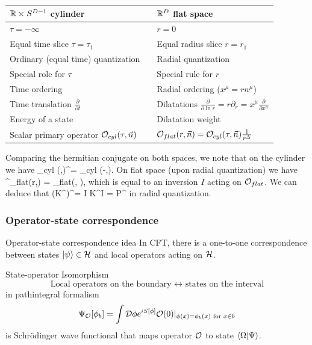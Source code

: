  \begin{tabular}{|lll|}
 	$\mathbb{R} \times S^{D-1}$ cylinder & \longrightarrow & $\mathbb{R}^D$ flat space \\
	\toprule
	$\tau = -\infty$ &&$r=0$\\
	Equal time slice $\tau =\tau_1$ && Equal radius slice $r=r_1$ \\
	Ordinary (equal time) quantization && Radial quantization \\
	Special role for $\tau$ && Special rule for $r$ \\
	Time ordering && Radial ordering ($x^\mu = r n^\mu$) \\
	Time translation $\frac{\partial}{\partial t}$ && Dilatations $\frac{\partial}{\partial \ln r} = r \partial_r = x^\mu \frac{\partial}{\partial x^\mu}$ \\
	Energy of a state && Dilatation weight \\
	Scalar primary operator $\mathcal{O}_{cyl}(\tau,\vec{n})$ && $\mathcal{O}_{flat}(r,\vec{n}) = \mathcal{O}_{cyl} (\tau,\vec{n}) \frac{1}{r^\Delta}$\\
\bottomrule 
\end{tabular}
\ese 
Comparing the hermitian conjugate on both spaces, we note that on the cylinder we have
\bse 
\mO_{cyl} (\tau,)^\dagger = \mO_{cyl} (-\tau,).
\ese 
On flat space (upon radial quantization) we have 
\be 
\label{eq:cftRadialQuantizationHermitianConjugate}
\mO^\dagger_{flat}(r,) =  \mO_{flat}(, ),
\ee 
which is equal to an inversion $I$ acting on $\mathcal{O}_{flat}$. We can deduce that 
\bse 
(K^\mu)^\dagger = I K^\mu I = P^\mu
\ese 
in radial quantization.

\subsubsection{Operator-state correspondence}
\begin{mybox}{Operator-state correspondence idea}
	In CFT, there is a one-to-one correspondence between states $\ket{\psi}\in \mathcal{H}$ and local operators acting on $\mathcal{H}$.
\end{mybox}

\begin{mybox}{State-operator Isomorphism}
	\begin{equation}
	\text{Local operators on the boundary }\leftrightarrow \text{ states on the interval}
	\end{equation}
	in pathintegral formalism
	\begin{equation}
	\Psi_{\mathcal{O}} [\phi_b] = \int \mathcal{D} \phi e^{i S[\phi]} \mathcal{O}(0)|_{\phi(x)=\phi_b(x) \text{ for } x\in b}
	\end{equation}
	is Schrödinger wave functional that maps operator $\mathcal{O}$ to state $\braket{\Omega}{\Psi}$.
\end{mybox}


